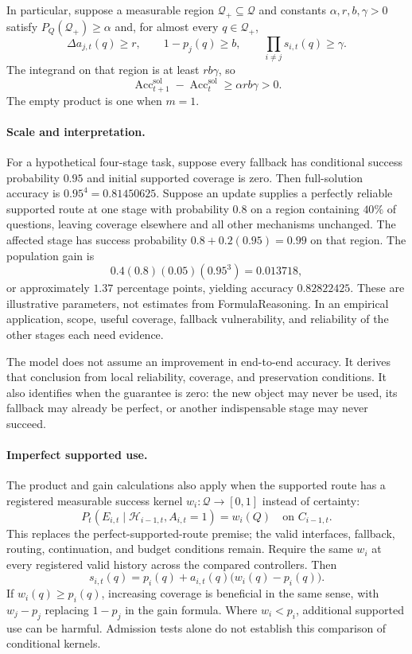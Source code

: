 \documentclass[10pt]{article} %
\providecommand{\1}{\mathbf{1}}  %
\theoremstyle{remark}
\theoremstyle{definition}
\begin{document}
In particular, suppose a measurable region $\mathcal Q_+\subseteq\mathcal Q$ and
constants $\alpha,r,b,\gamma>0$ satisfy $P_Q(\mathcal Q_+)\geq\alpha$ and, for
almost every $q\in\mathcal Q_+$,
\[
\Delta a_{j,t}(q)\geq r,\qquad
1-p_j(q)\geq b,\qquad
\prod_{i\neq j}s_{i,t}(q)\geq\gamma.
\]
The integrand on that region is at least $rb\gamma$, so
\begin{equation}
\operatorname{Acc}^{\mathrm{sol}}_{t+1}
-\operatorname{Acc}^{\mathrm{sol}}_t
\geq\alpha r b\gamma>0.
\label{eq:reuse-quantitative-gain}
\end{equation}
The empty product is one when $m=1$.

\paragraph{Scale and interpretation.}

For a hypothetical four-stage task, suppose every fallback has
conditional success probability $0.95$ and initial supported coverage is
zero. Then full-solution accuracy is $0.95^4=0.81450625$. Suppose an
update supplies a perfectly reliable supported route at one stage with
probability $0.8$ on a region containing $40\%$ of questions, leaving
coverage elsewhere and all other mechanisms unchanged. The affected stage has success
probability $0.8+0.2(0.95)=0.99$ on that region. The population gain is
\[
0.4(0.8)(0.05)(0.95^3)=0.013718,
\]
or approximately $1.37$ percentage points, yielding accuracy
$0.82822425$. These are illustrative parameters, not estimates from
FormulaReasoning. In an empirical application, scope, useful coverage,
fallback vulnerability, and reliability of the other stages each need
evidence.

The model does not assume an improvement in end-to-end accuracy.
It derives that conclusion from local reliability, coverage, and
preservation conditions. It also identifies when the guarantee is zero:
the new object may never be used, its fallback may already be perfect,
or another indispensable stage may never succeed.

\paragraph{Imperfect supported use.}
The product and gain calculations also apply when the supported route
has a registered measurable success kernel $w_i:\mathcal Q\to[0,1]$
instead of certainty:
\[
P_t(E_{i,t}\mid\mathcal H_{i-1,t},A_{i,t}=1)=w_i(Q)
\quad\text{on }C_{i-1,t}.
\]
This replaces the perfect-supported-route premise; the valid interfaces,
fallback, routing, continuation, and budget conditions remain. Require
the same $w_i$ at every registered valid history across the compared
controllers. Then
\begin{equation}
s_{i,t}(q)=p_i(q)+a_{i,t}(q)\bigl(w_i(q)-p_i(q)\bigr).
\label{eq:reuse-imperfect-stage-reliability}
\end{equation}
If $w_i(q)\geq p_i(q)$, increasing coverage is beneficial in the same
sense, with $w_j-p_j$ replacing $1-p_j$ in the gain formula. Where
$w_i<p_i$, additional supported use can be harmful. Admission tests
alone do not establish this comparison of conditional kernels.
\end{document}
